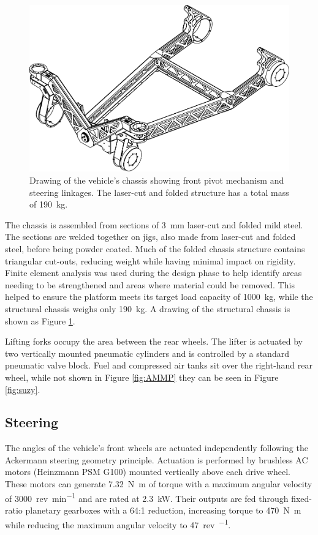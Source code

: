 \documentclass[preprint,authoryear,12pt]{elsarticle}
\begin{document}
        \begin{figure}[htb]
            \centering
            \includegraphics[width=0.6\linewidth]{imgs/profile_views/AMMP-Chassis-1-20.pdf}
            \caption{Drawing of the vehicle's chassis showing front pivot mechanism and steering linkages. The laser-cut and folded structure has a total mass of \SI{190}{\kilo\gram}.}
            \label{fig:AMMPChassis}
        \end{figure}

        The chassis is assembled from sections of \SI{3}{\milli\meter} laser-cut and folded mild steel.
        The sections are welded together on jigs, also made from laser-cut and folded steel, before being powder coated.
        Much of the folded chassis structure contains triangular cut-outs, reducing weight while having minimal impact on rigidity.
        Finite element analysis was used during the design phase to help identify areas needing to be strengthened and areas where material could be removed.
        This helped to ensure the platform meets its target load capacity of \SI{1000}{\kilo\gram}, while the structural chassis weighs only \SI{190}{\kilo\gram}.
        A drawing of the structural chassis is shown as Figure \ref{fig:AMMPChassis}.

        Lifting forks occupy the area between the rear wheels.
        The lifter is actuated by two vertically mounted pneumatic cylinders and is controlled by a standard pneumatic valve block.
        Fuel and compressed air tanks sit over the right-hand rear wheel, while not shown in Figure \ref{fig:AMMP} they can be seen in Figure \ref{fig:suzy}.

    \subsection{Steering}
    \label{sub:steering}

        The angles of the vehicle's front wheels are actuated independently following the Ackermann steering geometry principle.
        Actuation is performed by brushless AC motors (Heinzmann PSM G100) mounted vertically above each drive wheel.
        These motors can generate \SI{7.32}{\newton\meter} of torque with a maximum angular velocity of \SI{3000}{rev\per\minute} and are rated at \SI{2.3}{\kilo\watt}.
        Their outputs are fed through fixed-ratio planetary gearboxes with a 64:1 reduction, increasing torque to \SI{470}{\newton\meter} while reducing the maximum angular velocity to \SI{47}{rev\per\min}.
\end{document}

